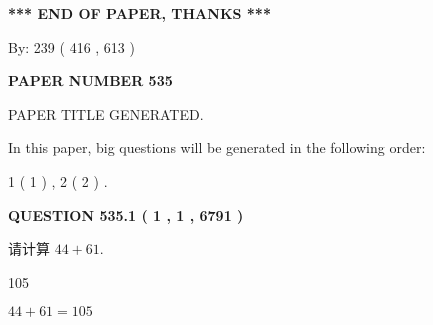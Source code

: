 \documentclass{ctexart}
\begin{document}
   
   
   
\vspace{1.0in} 
{\textbf{\large{ *** END OF PAPER, THANKS *** }}} 
   
   
\hspace{1.0in} By: 
 239 ( 416 ,  613 )
   
   
   
   
\newpage 
\setcounter{page}{ 
   535001 } 
   
   
   
   
 {\textbf{ \Large{ PAPER NUMBER  535  }}}
   
   
\vspace{0.2in}
   
   
   
   
   
   
   
   
 \vspace{0.2in}
 
 
 
 
   
   
 PAPER TITLE GENERATED.
   
   
   
\vspace{0.2in}
   
In this paper, big questions will be generated in the following order: 
   
   
   1 ( 1 )
 ,
   2 ( 2 )
 .
  
\vspace{0.2in}
  
{\textbf{\Large{QUESTION
535.1 
 ( 1 , 1 , 6791 )
}}}
  
  
 
请计算 $ %
44 +  %
61 $.
 
 
 
\noindent{}
 
 

105
 
 
\noindent{}
 
 

 
 
 
\noindent{}
 
 

$ %
44 +  %
61=   %
105$
 
\end{document}
